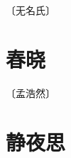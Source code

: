 \documentclass[12pt,UTF-8,openany]{ctexbook}
\begin{document}
\begin{center}
    \vspace{10pt}
    
    \begin{normalsize}
        
        〔无名氏〕
        
    \end{normalsize}
    
    \vspace{8pt}
    
    \begin{large}
        
        
        
    \end{large}
    
\end{center}

\vspace{8pt}


\section{春晓}

\begin{center}
    \vspace{10pt}
    
    \begin{normalsize}
        
        〔孟浩然〕
        
    \end{normalsize}
    
    \vspace{8pt}
    
    \begin{large}
        
        
        
    \end{large}
    
\end{center}

\vspace{8pt}


\section{静夜思}
\end{document}
